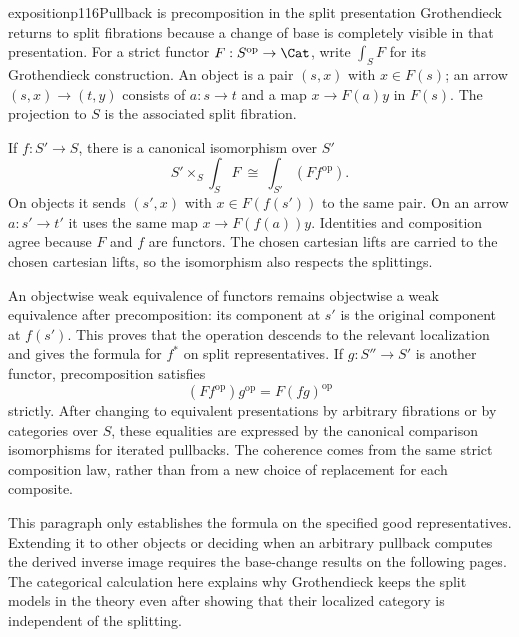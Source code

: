 \begin{dcomment}{exposition}{p116}{Pullback is precomposition in the split presentation}
Grothendieck returns to split fibrations because a change of base is completely visible in that presentation. For a strict functor $F:S^{\mathrm{op}}\to\Cat$, write $\int_SF$ for its Grothendieck construction. An object is a pair $(s,x)$ with $x\in F(s)$; an arrow $(s,x)\to(t,y)$ consists of $a:s\to t$ and a map $x\to F(a)y$ in $F(s)$. The projection to $S$ is the associated split fibration.

If $f:S'\to S$, there is a canonical isomorphism over $S'$
\[
 S'\times_S\int_SF\ \cong\ \int_{S'}(Ff^{\mathrm{op}}).
\]
On objects it sends $(s',x)$ with $x\in F(f(s'))$ to the same pair. On an arrow $a:s'\to t'$ it uses the same map $x\to F(f(a))y$. Identities and composition agree because $F$ and $f$ are functors. The chosen cartesian lifts are carried to the chosen cartesian lifts, so the isomorphism also respects the splittings.

An objectwise weak equivalence of functors remains objectwise a weak equivalence after precomposition: its component at $s'$ is the original component at $f(s')$. This proves that the operation descends to the relevant localization and gives the formula for $f^*$ on split representatives. If $g:S''\to S'$ is another functor, precomposition satisfies
\[
 (Ff^{\mathrm{op}})g^{\mathrm{op}}
   =F(fg)^{\mathrm{op}}
\]
strictly. After changing to equivalent presentations by arbitrary fibrations or by categories over $S$, these equalities are expressed by the canonical comparison isomorphisms for iterated pullbacks. The coherence comes from the same strict composition law, rather than from a new choice of replacement for each composite.

This paragraph only establishes the formula on the specified good representatives. Extending it to other objects or deciding when an arbitrary pullback computes the derived inverse image requires the base-change results on the following pages. The categorical calculation here explains why Grothendieck keeps the split models in the theory even after showing that their localized category is independent of the splitting.
\end{dcomment}


